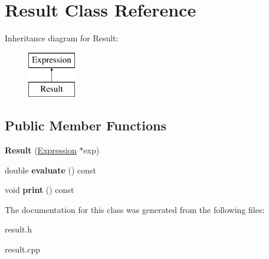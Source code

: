 \hypertarget{class_result}{}\section{Result Class Reference}
\label{class_result}
Inheritance diagram for Result\+:\begin{figure}[H]
\begin{center}
\leavevmode
\includegraphics[height=2.000000cm]{class_result}
\end{center}
\end{figure}
\subsection*{Public Member Functions}
\begin{DoxyCompactItemize}
\item 
\mbox{\label{class_result_a8fb8868bd4f4e305f436e98e052755f2}} 
{\bfseries Result} (\hyperlink{class_expression}{Expression} $\ast$exp)
\item 
\mbox{\label{class_result_a107a060722c095f33008ca435cb2397d}} 
double {\bfseries evaluate} () const
\item 
\mbox{\label{class_result_a17227de791c97a6eee68689f4317cafa}} 
void {\bfseries print} () const
\end{DoxyCompactItemize}


The documentation for this class was generated from the following files\+:\begin{DoxyCompactItemize}
\item 
result.\+h\item 
result.\+cpp\end{DoxyCompactItemize}
